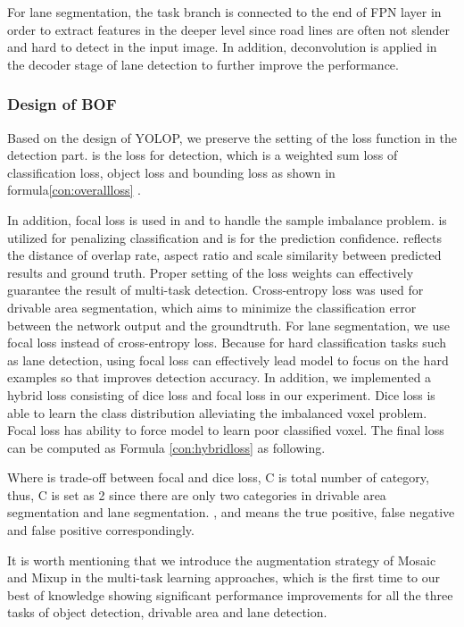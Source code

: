 \documentclass[10pt,twocolumn,letterpaper]{article}
\begin{document}
For lane segmentation, the task branch is connected to the end of FPN layer in order to extract features in the deeper level since road lines are often not slender and hard to detect in the input image. In addition, deconvolution is applied in the decoder stage of lane detection to further improve the performance.


\subsubsection{Design of BOF}
Based on the design of YOLOP, we preserve the setting of the loss function in the detection part.  is the loss for detection, which is a weighted sum loss of classification loss, object loss and bounding loss as shown in formula\ref{con:overallloss} .


In addition, focal loss is used in  and  to handle the sample imbalance problem.  is utilized for penalizing classification and  is for the prediction confidence.  reflects the distance of overlap rate, aspect ratio and scale similarity between predicted results and ground truth. Proper setting of the loss weights can effectively guarantee the result of multi-task detection.
Cross-entropy loss was used for drivable area segmentation, which aims to minimize the classification error between the network output and the groundtruth. For lane segmentation, we use focal loss instead of cross-entropy loss. Because for hard classification tasks such as lane detection, using focal loss can effectively lead model to focus on the hard examples so that improves detection accuracy. 
In addition, we implemented a hybrid loss \cite{zhu2019anatomynet} consisting of dice loss and focal loss in our experiment. Dice loss is able to learn the class distribution alleviating the imbalanced voxel problem. Focal loss has ability to force model to learn poor classified voxel. The final loss can be computed as Formula \ref{con:hybridloss} as following.





Where  is trade-off between focal and dice loss, C is total number of category, thus, C is set as 2 since there are only two categories in drivable area segmentation and lane segmentation. ,  and  means the true positive, false negative and false positive correspondingly.

It is worth mentioning that we introduce the augmentation strategy of Mosaic and Mixup \cite{zhang2017mixup} in the multi-task learning approaches, which is the first time to our best of knowledge showing significant performance improvements for all the three tasks of object detection, drivable area and lane detection.
\end{document}
